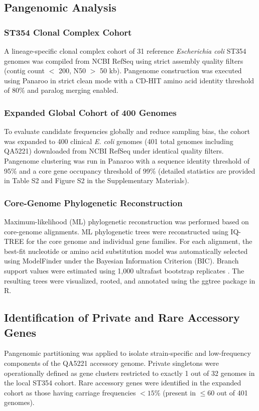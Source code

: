 \documentclass[pdflatex,sn-mathphys-num]{sn-jnl}
\begin{document}
\subsection{Pangenomic Analysis}\label{subsec:pangenome_analysis}
\subsubsection{ST354 Clonal Complex Cohort}
A lineage-specific clonal complex cohort of 31 reference \textit{Escherichia coli} ST354 genomes was compiled from NCBI RefSeq using strict assembly quality filters (contig count $<$ 200, N50 $>$ 50 kb). Pangenome construction was executed using Panaroo \cite{tonkin2020producing} in strict clean mode with a CD-HIT amino acid identity threshold of 80\% and paralog merging enabled.

\subsubsection{Expanded Global Cohort of 400 Genomes}
To evaluate candidate frequencies globally and reduce sampling bias, the cohort was expanded to 400 clinical \textit{E. coli} genomes (401 total genomes including QA5221) downloaded from NCBI RefSeq under identical quality filters. Pangenome clustering was run in Panaroo with a sequence identity threshold of 95\% and a core gene occupancy threshold of 99\% (detailed statistics are provided in Table S2 and Figure S2 in the Supplementary Materials).

\subsubsection{Core-Genome Phylogenetic Reconstruction}
Maximum-likelihood (ML) phylogenetic reconstruction was performed based on core-genome alignments. ML phylogenetic trees were reconstructed using IQ-TREE \cite{minh2020iqtree2} for the core genome and individual gene families. For each alignment, the best-fit nucleotide or amino acid substitution model was automatically selected using ModelFinder \cite{kalyaanamoorthy2017modelfinder} under the Bayesian Information Criterion (BIC). Branch support values were estimated using 1,000 ultrafast bootstrap replicates \cite{hoang2018ufboot}. The resulting trees were visualized, rooted, and annotated using the ggtree package in R.

\subsection{Identification of Private and Rare Accessory Genes}\label{subsec:accessory_genes}
Pangenomic partitioning was applied to isolate strain-specific and low-frequency components of the QA5221 accessory genome. Private singletons were operationally defined as gene clusters restricted to exactly 1 out of 32 genomes in the local ST354 cohort. Rare accessory genes were identified in the expanded cohort as those having carriage frequencies $< 15$\% (present in $\le 60$ out of 401 genomes).
\end{document}
